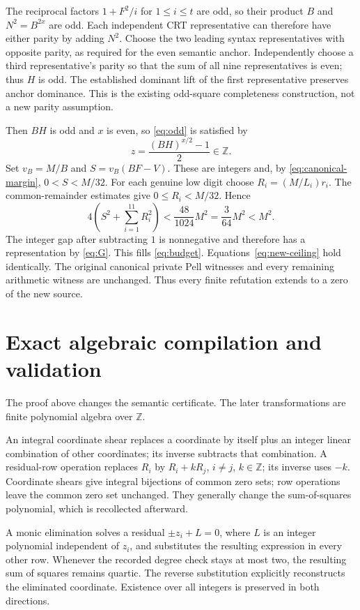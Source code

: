 \documentclass[11pt,letterpaper]{article}
\theoremstyle{remark}\newtheorem{remark}[theorem]{Remark}
\newcommand{\Z}{\mathbb Z}\newcommand{\N}{\mathbb N}
\begin{document}
The reciprocal factors $1+F^2/i$ for $1\le i\le t$ are odd, so their product $B$ and $N^2=B^{2x}$ are odd. Each independent CRT representative can therefore have either parity by adding $N^2$. Choose the two leading syntax representatives with opposite parity, as required for the even semantic anchor. Independently choose a third representative's parity so that the sum of all nine representatives is even; thus $H$ is odd. The established dominant lift of the first representative preserves anchor dominance. This is the existing odd-square completeness construction, not a new parity assumption.

Then $BH$ is odd and $x$ is even, so \eqref{eq:odd} is satisfied by
\[
 z=\frac{(BH)^{x/2}-1}{2}\in\Z.
\]
Set $v_B=M/B$ and $S=v_B(BF-V)$. These are integers and, by \eqref{eq:canonical-margin}, $0<S<M/32$. For each genuine low digit choose $R_i=(M/L_i)r_i$. The common-remainder estimates give $0\le R_i<M/32$. Hence
\[
 4\left(S^2+\sum_{i=1}^{11}R_i^2\right)
 <\frac{48}{1024}M^2=\frac3{64}M^2<M^2.
\]
The integer gap after subtracting $1$ is nonnegative and therefore has a representation by \eqref{eq:G}. This fills \eqref{eq:budget}. Equations~\eqref{eq:new-ceiling} hold identically. The original canonical private Pell witnesses and every remaining arithmetic witness are unchanged. Thus every finite refutation extends to a zero of the new source.

\section{Exact algebraic compilation and validation}
\label{sec:algebra}
The proof above changes the semantic certificate. The later transformations are finite polynomial algebra over $\Z$.

An integral coordinate shear replaces a coordinate by itself plus an integer linear combination of other coordinates; its inverse subtracts that combination. A residual-row operation replaces $R_i$ by $R_i+kR_j$, $i\ne j$, $k\in\Z$; its inverse uses $-k$. Coordinate shears give integral bijections of common zero sets; row operations leave the common zero set unchanged. They generally change the sum-of-squares polynomial, which is recollected afterward.

A monic elimination solves a residual $\pm z_i+L=0$, where $L$ is an integer polynomial independent of $z_i$, and substitutes the resulting expression in every other row. Whenever the recorded degree check stays at most two, the resulting sum of squares remains quartic. The reverse substitution explicitly reconstructs the eliminated coordinate. Existence over all integers is preserved in both directions.
\end{document}
